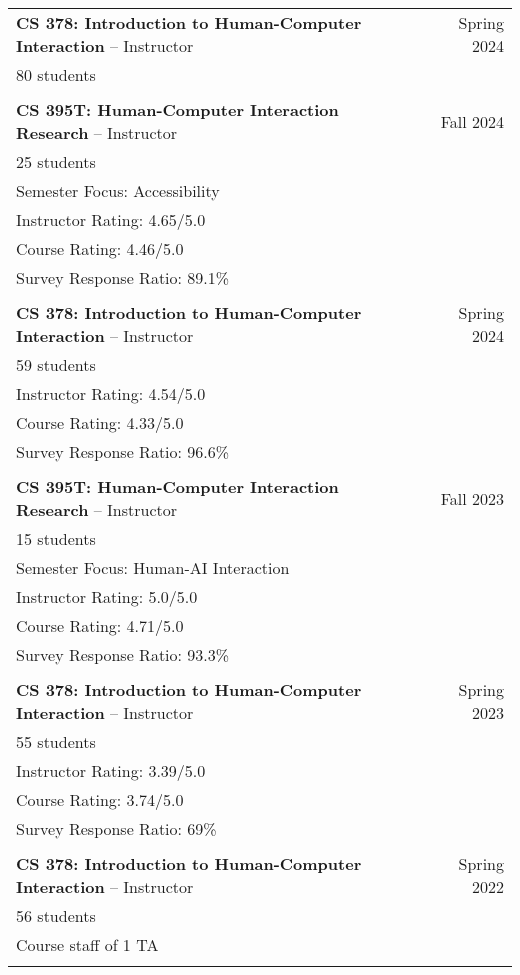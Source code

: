 \begin{longtable}{Xr}
	\textbf{CS 378: Introduction to Human-Computer Interaction} -- Instructor & Spring 2024 \\
	80 students &  \\
	\\

	\textbf{CS 395T: Human-Computer Interaction Research} -- Instructor & Fall 2024 \\
	25 students &  \\
	Semester Focus: Accessibility &  \\
	Instructor Rating: 4.65/5.0 &  \\
	Course Rating: 4.46/5.0 &  \\
	Survey Response Ratio: 89.1\% &  \\
	\\

	\textbf{CS 378: Introduction to Human-Computer Interaction} -- Instructor & Spring 2024 \\
	59 students &  \\
	Instructor Rating: 4.54/5.0 &  \\
	Course Rating: 4.33/5.0 &  \\
	Survey Response Ratio: 96.6\% &  \\
	\\

	\textbf{CS 395T: Human-Computer Interaction Research} -- Instructor & Fall 2023 \\
	15 students &  \\
	Semester Focus: Human-AI Interaction &  \\
	Instructor Rating: 5.0/5.0 &  \\
	Course Rating: 4.71/5.0 &  \\
	Survey Response Ratio: 93.3\% &  \\
	\\

	\textbf{CS 378: Introduction to Human-Computer Interaction} -- Instructor & Spring 2023 \\
	55 students &  \\
	Instructor Rating: 3.39/5.0 &  \\
	Course Rating: 3.74/5.0 &  \\
	Survey Response Ratio: 69\% &  \\
	\\

	\textbf{CS 378: Introduction to Human-Computer Interaction} -- Instructor & Spring 2022 \\
	56 students &  \\
	Course staff of 1 TA &  \\
	\\


\end{longtable}
